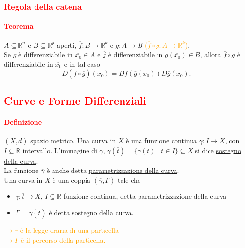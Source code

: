 \documentclass{article}
\newcommand{\R}{\mathbb{R}}
\begin{document}
\subsubsection{\textcolor{red}{Regola della catena}}
\paragraph{\textcolor{red}{Teorema}}
$A \subseteq \R^n$ e $B \subseteq \R^p$ aperti, $\overline{f}: B \rightarrow \R^k$ e $\overline{g}:A \rightarrow B$
\textcolor{orange}{($\overline{f}\circ \overline{g}: A \rightarrow \R^k$)}.\\
Se $\overline{g}$ è differenziabile in $\overline{x_0}\in A$ e $\overline{f}$ è differenziabile in $\overline{g}(\overline{x_0})\in B$, allora $\overline{f}\circ \overline{g}$ è differenziabile in $\overline{x_0}$ e in tal caso
\begin{equation*}
    D(\overline{f}\circ \overline{g})(\overline{x_0})=D\overline{f}(\overline{g}(\overline{x_0}))D\overline{g}(\overline{x_0}).
\end{equation*}

\subsection{\textcolor{red}{Curve e Forme Differenziali}}

\paragraph{\textcolor{red}{Definizione}}
$(X,d)$ spazio metrico. Una \underline{curva} in $X$ è una funzione continua $\overline{\gamma}:I \rightarrow X$, con $I \subseteq \R$ intervallo. L'immagine di $\overline{\gamma}$, $\overline{\gamma}(\overline{t})=\{\overline{\gamma}(t)\mid t \in I \}\subseteq X$ si dice \underline{sostegno della curva}.\\
La funzione $\overline{\gamma}$ è anche detta \underline{parametrizzazione della curva}.\\
Una curva in $X$ è una coppia $(\overline{\gamma},\Gamma)$ tale che
\begin{itemize}
    \item $\overline{\gamma}:\overline{t}\rightarrow X$, $I \subseteq \R$ funzione continua, detta parametrizzazione della curva
    \item $\Gamma=\overline{\gamma}(\overline{t})$ è detta sostegno della curva.
\end{itemize}
\textcolor{orange}{$\rightarrow \overline{\gamma}$ è la legge oraria di una particella\\
$\rightarrow \Gamma$ è il percorso della particella.}
\end{document}
